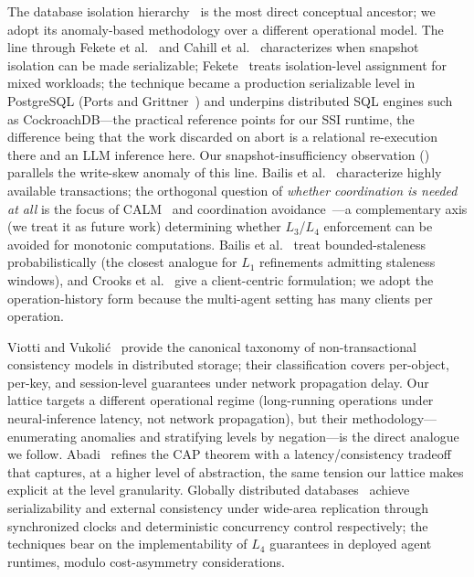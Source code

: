 \documentclass[journal,compsoc,10pt]{IEEEtran}
\providecommand{\citep}{\cite}
\theoremstyle{definition}
\theoremstyle{remark}
\begin{document}
The database isolation
hierarchy~\citep{BerensonEtAl1995,Adya1999,AdyaLiskovOneil2000} is
the most direct conceptual ancestor; we adopt its anomaly-based
methodology over a different operational model. The line through
Fekete et al.~\cite{FeketeEtAl2005MakingSI} and
Cahill et al.~\cite{CahillRohmFekete2008SSI} characterizes when snapshot
isolation can be made serializable; Fekete~\cite{Fekete2005Allocating}
treats isolation-level assignment for mixed workloads; the technique
became a production serializable level in PostgreSQL
(Ports and Grittner~\cite{PortsGrittner2012}) and underpins distributed SQL
engines such as CockroachDB---the practical reference points for our SSI
runtime, the difference being that the work discarded on abort is a
relational re-execution there and an LLM inference here. Our
snapshot-insufficiency observation
() parallels the write-skew anomaly of
this line. Bailis et al.~\cite{BailisEtAl2014HAT} characterize highly
available transactions; the orthogonal question of \emph{whether
coordination is needed at all} is the focus of
CALM~\citep{Hellerstein2020CALM} and coordination
avoidance~\citep{BailisEtAl2014Coordination}---a complementary axis (we
treat it as future work) determining whether $L_3$/$L_4$ enforcement can be
avoided for monotonic computations. Bailis et
al.~\cite{BailisEtAl2012PBS} treat bounded-staleness probabilistically
(the closest analogue for $L_1$ refinements admitting staleness windows),
and Crooks et al.~\cite{CrooksEtAl2017Seeing} give a client-centric
formulation; we adopt the operation-history form because the multi-agent
setting has many clients per operation.

Viotti and Vukoli\'c~\cite{ViottiVukolic2016Consistency} provide the canonical taxonomy
of non-transactional consistency models in distributed storage;
their classification covers per-object, per-key, and session-level
guarantees under network propagation delay. Our lattice targets a
different operational regime (long-running operations under
neural-inference latency, not network propagation), but their
methodology---enumerating anomalies and stratifying levels by
negation---is the direct analogue we follow.
Abadi~\cite{Abadi2012PACELC} refines the CAP theorem with a
latency/consistency tradeoff that captures, at a higher level of
abstraction, the same tension our lattice makes explicit at the
level granularity. Globally distributed
databases~\citep{CorbettEtAl2012Spanner,ThomsonEtAl2012Calvin} achieve
serializability and external consistency under wide-area replication
through synchronized clocks and deterministic concurrency control
respectively; the techniques bear on the implementability of $L_4$
guarantees in deployed agent runtimes, modulo cost-asymmetry
considerations.
\end{document}
